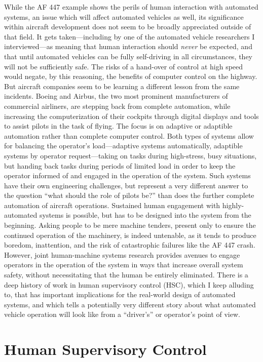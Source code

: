 While the AF 447 example shows the
perils of human interaction with automated systems, an issue which will
affect automated vehicles as well, its significance
within aircraft development does not seem to be broadly appreciated
outside of that field. It gets taken---including by one of the
automated vehicle researchers I interviewed---as meaning that human
interaction should \emph{never} be expected, and that until automated
vehicles can be fully self-driving in all circumstances, they will not
be sufficiently safe. The risks of a hand-over of control at high
speed would negate, by this reasoning, the benefits of computer
control on the highway. But aircraft companies seem to be learning a
different lesson from the same incidents. Boeing and Airbus, the two
most prominent manufacturers of commercial airliners, are stepping
back from complete automation, while increasing the computerization of
their cockpits through digital displays and tools to assist pilots in
the task of flying\cite{???}. The focus is on adaptive or adaptible automation
rather than complete computer control. Both types of systems allow for
balancing the operator's load---adaptive systems automatically,
adaptible systems by operator request---taking on tasks during
high-stress, busy situations, but handing back tasks during periods of
limited load in order to keep the operator informed of and engaged in
the operation of the system\cite{???}. Such systems have their own
engineering challenges, but represent a very different answer to the
question ``what should the role of pilots be?'' than does the further
complete automation of aircraft operations. Sustained human engagement
with highly-automated systems is possible, but has to be designed into
the system from the beginning. Asking people to be mere machine
tenders, present only to ensure the continued operation of the
machinery, is indeed untenable, as it tends to produce boredom,
inattention, and the risk of catastrophic failures like the AF 447
crash. However, joint human-machine systems research provides avenues
to engage operators in the operation of the system in ways that
increase overall system safety, without necessitating that the human
be entirely eliminated. There is a deep history of
work in human supervisory control (HSC), which I keep alluding to,
that has important implications 
for the real-world design of automated systems, and which tells a
potentially very different story about what automated vehicle
operation will look like from a ``driver's'' or operator's point of view.

\section{Human Supervisory Control}


